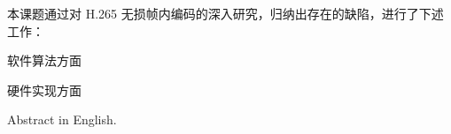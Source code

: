 \begin{cabstract}



    本课题通过对 H.265 无损帧内编码的深入研究，归纳出存在的缺陷，进行了下述工作：

    软件算法方面

    硬件实现方面
\end{cabstract}


\begin{eabstract}
    Abstract in English.
\end{eabstract}

